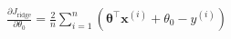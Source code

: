 \documentclass[preview]{standalone}
\begin{document}
\begin{align*}
\frac{\partial J_{\text{ridge}}}{\partial \theta_0} = \frac{2}{n} \sum_{i=1}^n \left(\mathbf{\theta}^{\top}\mathbf{x}^{(i)} + \theta_0 - y^{(i)}\right)
\end{align*}
\end{document}
